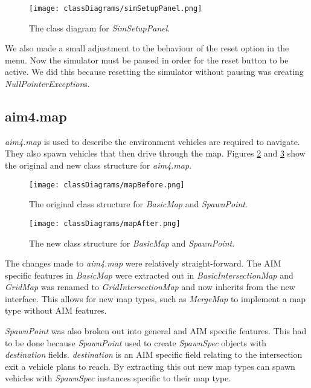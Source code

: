 \begin{figure}[htb]
\texttt{[image: classDiagrams/simSetupPanel.png]}
\caption{The class diagram for \emph{SimSetupPanel}.}
\label{fig:simSetupPanel}
\end{figure}

We also made a small adjustment to the behaviour of the reset option in the menu. Now the simulator must be paused in order for the reset button to be active. We did this because resetting the simulator without pausing was creating \emph{NullPointerException}s.

\subsection{aim4.map}
\label{subsec:aim4.map}
\emph{aim4.map} is used to describe the environment vehicles are required to navigate. They also spawn vehicles that then drive through the map. Figures \ref{fig:mapBefore} and \ref{fig:mapAfter} show the original and new class structure for \emph{aim4.map}.

\begin{figure}[htb]
\texttt{[image: classDiagrams/mapBefore.png]}
\caption{The original class structure for \emph{BasicMap} and \emph{SpawnPoint}.}
\label{fig:mapBefore}
\end{figure}

\begin{figure}[htb]
\texttt{[image: classDiagrams/mapAfter.png]}
\caption{The new class structure for \emph{BasicMap} and \emph{SpawnPoint}.}
\label{fig:mapAfter}
\end{figure}

The changes made to \emph{aim4.map} were relatively straight-forward. The AIM specific features in \emph{BasicMap} were extracted out in \emph{BasicIntersectionMap} and \emph{GridMap} was renamed to \emph{GridIntersectionMap} and now inherits from the new interface. This allows for new map types, such as \emph{MergeMap} to implement a map type without AIM features.

\emph{SpawnPoint} was also broken out into general and AIM specific features. This had to be done because \emph{SpawnPoint} used to create \emph{SpawnSpec} objects with \emph{destination} fields. \emph{destination} is an AIM specific field relating to the intersection exit a vehicle plans to reach. By extracting this out new map types can spawn vehicles with \emph{SpawnSpec} instances specific to their map type.

